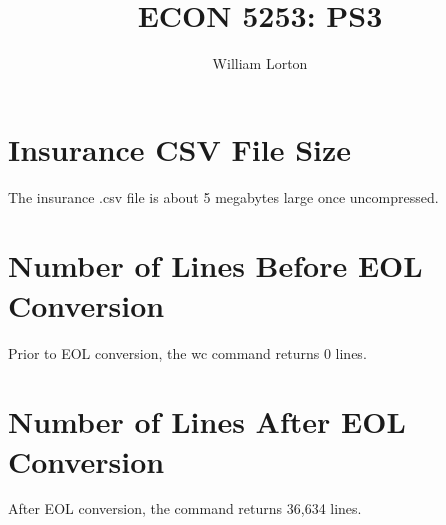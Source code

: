 \documentclass{homeworg}
\title{ECON 5253: PS3}
\author{William Lorton}
\begin{document}
\maketitle

\section{Insurance CSV File Size}

The insurance .csv file is about 5 megabytes large once uncompressed.

\section{Number of Lines Before EOL Conversion}

Prior to EOL conversion, the wc command returns 0 lines. 

\section{Number of Lines After EOL Conversion}

After EOL conversion, the command returns 36,634 lines.
\end{document}
